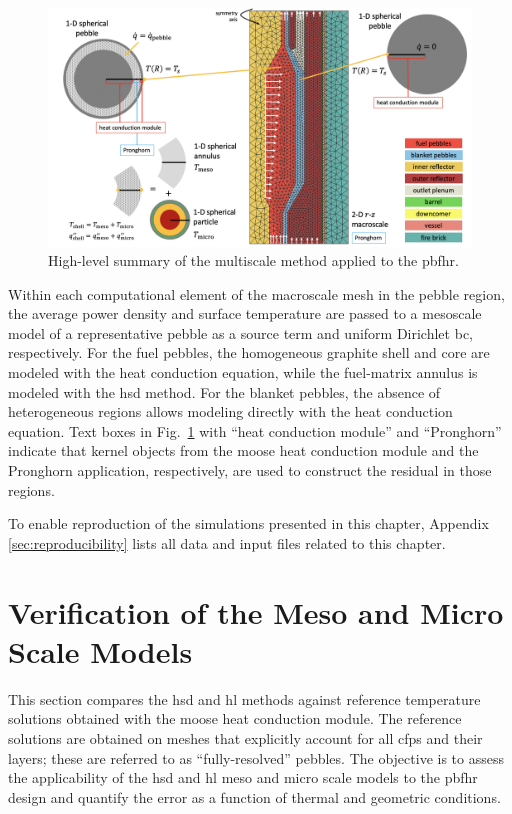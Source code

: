 \begin{figure}[h!]
\centering
\includegraphics[width=\linewidth]{figs/high_level_pbfhr.png}
\caption{High-level summary of the multiscale method applied to the \gls{pbfhr}.}
\label{fig:high_level}
\end{figure}

Within each computational element of the macroscale mesh in the pebble region, the average power density and surface temperature are passed to a mesoscale model of a representative pebble as a source term and uniform Dirichlet \gls{bc}, respectively. For the fuel pebbles, the homogeneous graphite shell and core are modeled with the heat conduction equation, while the fuel-matrix annulus is modeled with the \gls{hsd} method. For the blanket pebbles, the absence of heterogeneous regions allows modeling directly with the heat conduction equation. Text boxes in Fig.\ \ref{fig:high_level} with ``heat conduction module'' and ``Pronghorn'' indicate that kernel objects from the \gls{moose} heat conduction module and the Pronghorn application, respectively, are used to construct the residual in those regions.

To enable reproduction of the simulations presented in this chapter, Appendix \ref{sec:reproducibility} lists all data and input files related to this chapter.

\section{Verification of the Meso and Micro Scale Models}
\label{sec:meso_fhr}

This section compares the \gls{hsd} and \gls{hl} methods against reference temperature solutions obtained with the \gls{moose} heat conduction module. The reference solutions are obtained on meshes that explicitly account for all \glspl{cfp} and their layers; these are referred to as ``fully-resolved'' pebbles. The objective is to assess the applicability of the \gls{hsd} and \gls{hl} meso and micro scale models to the \gls{pbfhr} design and quantify the error as a function of thermal and geometric conditions.

